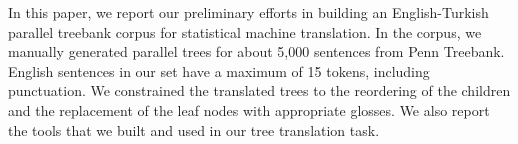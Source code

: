 In this paper, we report our preliminary efforts in building an English-Turkish parallel treebank corpus for statistical machine translation. In the corpus, we manually generated parallel trees for about 5,000 sentences from Penn Treebank. English sentences in our set have a maximum of 15 tokens, including punctuation. We constrained the translated trees to the reordering of the children and the replacement of the leaf nodes with appropriate glosses. We also report the tools that we built and used in our tree translation task.
